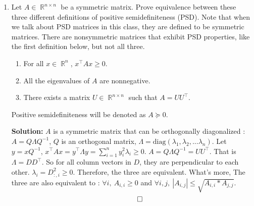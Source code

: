 \documentclass{article}
\DeclareMathOperator{\rank}{\mathrm{rank}}
\DeclareMathOperator{\R}{\mathbb{R}}
\newenvironment{solution}{\color{blue} \smallskip \textbf{Solution:}}{}
\begin{document}
\begin{enumerate}
\begin{solution}
\begin{enumerate}
        \item
        $A\R^n$ is $\text{Col}(A)$. \newline
        For any vector $v \in \R^n$, $A^\top Av \in A^\top A\R^n$: $\forall w \in \text{Null}(A)$, ($A^\top Av) \cdot w = (v^\top A^\top A)w = v^\top A^\top (A w) = \mathbf{0}$. So $A^\top Av \perp w$. That means $A^\top A\R^n \subseteq \text{Row}(A)$.
        Because $\rank (A^\top A) = \rank A$, $A^\top A\R^n = \text{Row}(A)$.
        \[ \qedhere \]

        \end{enumerate}  
    \end{solution}

    \item 
    Let $A \in \R^{n\times n}$ be a symmetric matrix.
    Prove equivalence between these three different definitions of positive semidefiniteness (PSD).
    Note that when we talk about PSD matrices in this class, they are defined to be symmetric matrices.
    There are nonsymmetric matrices that exhibit PSD properties, like the first definition below, but not all three.
    \begin{enumerate}
        \item For all $x\in\R^n$, $x^\top Ax\geq 0$.
        \item All the eigenvalues of $A$ are nonnegative.
        \item There exists a matrix $U\in\R^{n\times n}$ such that $A = UU^\top $.
    \end{enumerate}
    Positive semidefiniteness will be denoted as $A\succeq 0$. 
    
    \begin{solution}
        $A$ is a symmetric matrix that can be orthogonally diagonalized : $A = Q\Lambda Q^{-1}$, $Q$ is an orthogonal matrix, $\Lambda = \text{diag}(\lambda_1,\lambda_2,...\lambda_n)$.
        Let $y = xQ^{-1}$, $x^\top Ax = y^\top \Lambda y = \sum_{i=1}^{n}y_i^2 \lambda_i \geq 0$. $A=Q\Lambda Q^{-1}=UU^\top$. That is $\Lambda=DD^\top$. So for all column vectors in $D$, they are perpendicular to each other. $\lambda_i=D_{:,i}^2 \geq 0$. Therefore, the three are equivalent. \newline
        What's more, The three are also equivalent to : $\forall i,\  A_{i, i} \geq 0$ and $\forall i, j,\  | A_{i,j} | \leq \sqrt{A_{i, i} * A_{j, j}}$.
        \[ \qedhere \]
    \end{solution}


\end{enumerate}
\end{document}

